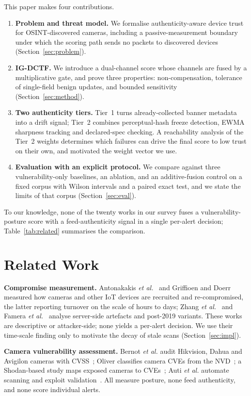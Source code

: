 \documentclass[journal]{IEEEtran}
\begin{document}
This paper makes four contributions.
\begin{enumerate}
\item \textbf{Problem and threat model.} We formalise authenticity-aware device trust for OSINT-discovered cameras, including a passive-measurement boundary under which the scoring path sends no packets to discovered devices (Section~\ref{sec:problem}).
\item \textbf{IG-DCTF.} We introduce a dual-channel score whose channels are fused by a multiplicative gate, and prove three properties: non-compensation, tolerance of single-field benign updates, and bounded sensitivity (Section~\ref{sec:method}).
\item \textbf{Two authenticity tiers.} Tier~1 turns already-collected banner metadata into a drift signal; Tier~2 combines perceptual-hash freeze detection, EWMA sharpness tracking and declared-spec checking. A reachability analysis of the Tier~2 weights determines which failures can drive the final score to low trust on their own, and motivated the weight vector we use.
\item \textbf{Evaluation with an explicit protocol.} We compare against three vulnerability-only baselines, an ablation, and an additive-fusion control on a fixed corpus with Wilson intervals and a paired exact test, and we state the limits of that corpus (Section~\ref{sec:eval}).
\end{enumerate}
To our knowledge, none of the twenty works in our survey fuses a vulnerability-posture score with a feed-authenticity signal in a single per-alert decision; Table~\ref{tab:related} summarises the comparison.

\section{Related Work}
\label{sec:related}
\textbf{Compromise measurement.} Antonakakis \emph{et al.}~\cite{antonakakis2017mirai} and Griffioen and Doerr~\cite{griffioen2020mirai} measured how cameras and other IoT devices are recruited and re-compromised, the latter reporting turnover on the scale of hours to days; Zhang \emph{et al.}~\cite{zhang2020forensics} and Famera \emph{et al.}~\cite{famera2025mirai} analyse server-side artefacts and post-2019 variants. These works are descriptive or attacker-side; none yields a per-alert decision. We use their time-scale finding only to motivate the decay of stale scans (Section~\ref{sec:impl}).

\textbf{Camera vulnerability assessment.} Bernot \emph{et al.} audit Hikvision, Dahua and Avigilon cameras with CVSS~\cite{bernot2025cctv}; Oliver classifies camera CVEs from the NVD~\cite{oliver2025ipcam,nvd}; a Shodan-based study maps exposed cameras to CVEs~\cite{kth2018cameras}; Auti \emph{et al.} automate scanning and exploit validation~\cite{auti2025vapt}. All measure posture, none feed authenticity, and none score individual alerts.
\end{document}
